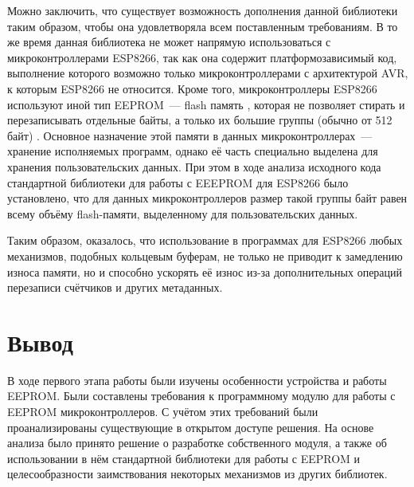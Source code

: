 Можно заключить, что существует возможность дополнения данной библиотеки таким образом, чтобы она удовлетворяла всем поставленным требованиям.
В то же время данная библиотека не может напрямую использоваться с микроконтроллерами ESP8266, так как она содержит платформозависимый код, выполнение которого возможно только микроконтроллерами с архитектурой AVR, к которым ESP8266 не относится.
Кроме того, микроконтроллеры ESP8266 используют иной тип EEPROM~--- flash память \cite{web:esp-eeprom-src, web:usage-of-esp-eeprom}, которая не позволяет стирать и перезаписывать отдельные байты, а только их большие группы (обычно от 512 байт) \cite{incollection:flash-memory}.
Основное назначение этой памяти в данных микроконтроллерах~--- хранение исполняемых программ, однако её часть специально выделена для хранения пользовательских данных.
При этом в ходе анализа исходного кода стандартной библиотеки \cite{web:esp-eeprom-src} для работы с EEEPROM для ESP8266 было установлено, что для данных микроконтроллеров размер такой группы байт равен всему объёму flash-памяти, выделенному для пользовательских данных.

Таким образом, оказалось, что использование в программах для ESP8266 любых механизмов, подобных кольцевым буферам, не только не приводит к замедлению износа памяти, но и способно ускорять её износ из-за дополнительных операций перезаписи счётчиков и других метаданных.

\section{Вывод}

В ходе первого этапа работы были изучены особенности устройства и работы EEPROM.
Были составлены требования к программному модулю для работы с EEPROM микроконтроллеров.
С учётом этих требований были проанализированы существующие в открытом доступе решения.
На основе анализа было принято решение о разработке собственного модуля, а также об использовании в нём стандартной библиотеки для работы с EEPROM и целесообразности заимствования некоторых механизмов из других библиотек.
